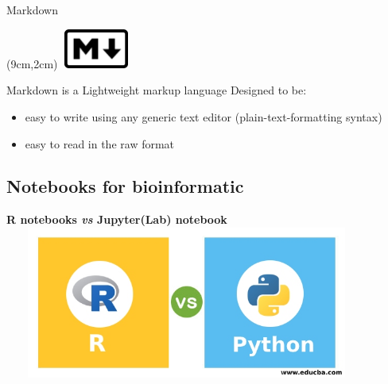 \begin{frame}{Markdown}
\begin{textblock*}{5cm}(9cm,2cm) %
\includegraphics[width=2.3cm,height=1.3cm]{images/Markdown-mark.pdf}
\end{textblock*}
Markdown is a Lightweight markup language
\newline
Designed to be:
\pause
\begin{itemize}[<+->]
	\item easy to write using any generic text editor (plain-text-formatting syntax)
	\item easy to read in the raw format
\end{itemize}
\end{frame}

\subsection*{Notebooks for bioinformatic}
\begin{frame}
\centering\textbf{R notebooks \emph{vs} Jupyter(Lab) notebook}
\newline
\includegraphics[width=12cm,height=5cm]{images/R-vs-Python.jpg}
\end{frame}


